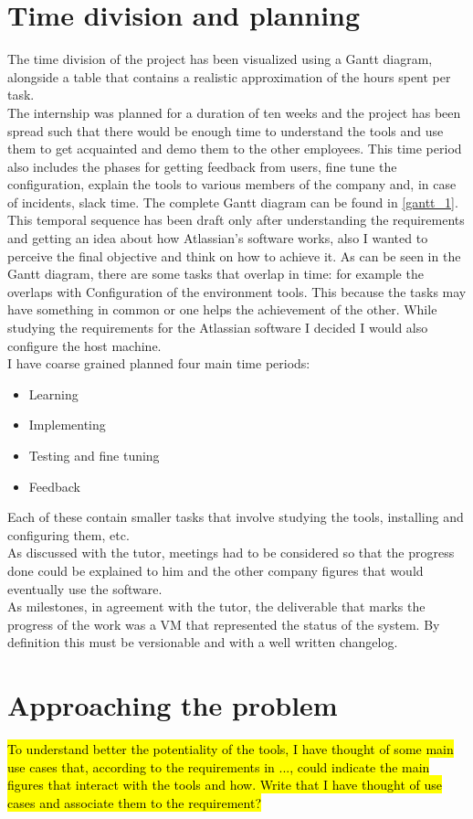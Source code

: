 \section{Time division and planning}
	The time division of the project has been visualized using a Gantt diagram, alongside a table that contains a realistic approximation of the hours spent per task.\\
	The internship was planned for a duration of ten weeks and the project has been spread such that there would be enough time to understand the tools and use them to get acquainted and demo them to the other employees.
	This time period also includes the phases for getting feedback from users, fine tune the configuration, explain the tools to various members of the company and, in case of incidents, slack time.
	The complete Gantt diagram can be found in \ref{gantt_1}.\\
	This temporal sequence has been draft only after understanding the requirements and getting an idea about how Atlassian's software works, also I wanted to perceive the final objective and think on how to achieve it.
	As can be seen in the Gantt diagram, there are some tasks that overlap in time: for example the  overlaps with Configuration of the environment tools.
	This because the tasks may have something in common or one helps the achievement of the other.
	While studying the requirements for the Atlassian software I decided I would also configure the host machine.\\
	I have coarse grained planned four main time periods:
	\begin{itemize}
		\item Learning
		\item Implementing
		\item Testing and fine tuning
		\item Feedback
	\end{itemize}
	Each of these contain smaller tasks that involve studying the tools, installing and configuring them, etc.\\
	As discussed with the tutor, meetings had to be considered so that the progress done could be explained to him and the other company figures that would eventually use the software.\\
	As \gls{milestones}, in agreement with the tutor, the deliverable that marks the progress of the work was a VM that represented the status of the system.
	By definition this must be versionable and with a well written changelog.
	
\section{Approaching the problem}
	\hl{To understand better the potentiality of the tools, I have thought of some main use cases that, according to the requirements in ..., could indicate the main figures that interact with the tools and how.
	Write that I have thought of use cases and associate them to the requirement?}

	
	